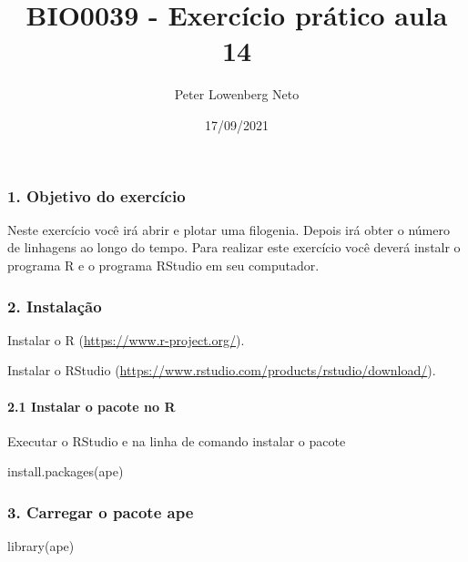 \documentclass[
]{article}
\title{BIO0039 - Exercício prático aula 14}
\author{Peter Lowenberg Neto}
\date{17/09/2021}
\newenvironment{Shaded}{\begin{snugshade}}{\end{snugshade}}
\newcommand{\FunctionTok}[1]{\textcolor[rgb]{0.00,0.00,0.00}{#1}}
\newcommand{\NormalTok}[1]{#1}
\newcommand{\StringTok}[1]{\textcolor[rgb]{0.31,0.60,0.02}{#1}}
\begin{document}
\maketitle

\hypertarget{objetivo-do-exercuxedcio}{%
\subsubsection{1. Objetivo do
exercício}\label{objetivo-do-exercuxedcio}}

Neste exercício você irá abrir e plotar uma filogenia. Depois irá obter
o número de linhagens ao longo do tempo. Para realizar este exercício
você deverá instalr o programa R e o programa RStudio em seu computador.

\hypertarget{instalauxe7uxe3o}{%
\subsubsection{2. Instalação}\label{instalauxe7uxe3o}}

Instalar o R (\url{https://www.r-project.org/}).

Instalar o RStudio
(\url{https://www.rstudio.com/products/rstudio/download/}).

\hypertarget{instalar-o-pacote-no-r}{%
\paragraph{2.1 Instalar o pacote no R}\label{instalar-o-pacote-no-r}}

Executar o RStudio e na linha de comando instalar o pacote

\begin{Shaded}
\begin{Highlighting}[]
\FunctionTok{install.packages}\NormalTok{(}\StringTok{\textquotesingle{}ape\textquotesingle{}}\NormalTok{)}
\end{Highlighting}
\end{Shaded}

\hypertarget{carregar-o-pacote-ape}{%
\subsubsection{3. Carregar o pacote ape}\label{carregar-o-pacote-ape}}

\begin{Shaded}
\begin{Highlighting}[]
\FunctionTok{library}\NormalTok{(ape)}
\end{Highlighting}
\end{Shaded}
\end{document}
